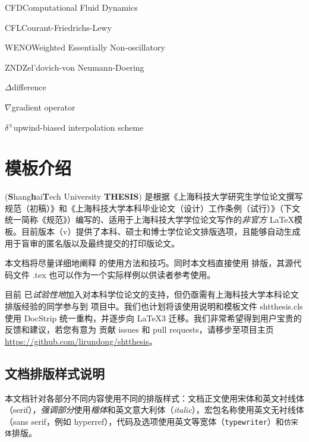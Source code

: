 \documentclass[master]{shtthesis}
\begin{document}
\begin{nomenclatures}[缩写]
  \item{CFD}{Computational Fluid Dynamics}
  \item{CFL}{Courant-Friedrichs-Lewy}
  \item{WENO}{Weighted Essentially Non-oscillatory}
  \item{ZND}{Zel'dovich-von Neumann-Doering}
\end{nomenclatures}

\begin{nomenclatures}[算子 \& 说明]
  \item{$\Delta$}{difference}
  \item{$\nabla$}{gradient operator}
  \item{$\delta^{\pm}$}{upwind-biased interpolation scheme}
\end{nomenclatures}
\fi

\mainmatter
\chapter{模板介绍}
\shtthesis{} (\textbf{S}hang\textbf{h}ai\textbf{T}ech University \textbf{THESIS}) 是根据《上海科技大学研究生学位论文撰写规范（初稿）》和《上海科技大学本科毕业论文（设计）工作条例（试行）》（下文统一简称《规范》）编写的、适用于上海科技大学学位论文写作的\emph{非官方} \LaTeX 模板。目前版本（v\version{}）提供了本科、硕士和博士学位论文排版选项，且能够自动生成用于盲审的匿名版以及最终提交的打印版论文。

本文档将尽量详细地阐释 \shtthesis{} 的使用方法和技巧。同时本文档直接使用 \shtthesis{} 排版，其源代码文件 \jobname.tex 也可以作为一个实际样例以供读者参考使用。

目前 \shtthesis{} 已\emph{试验性地}加入对本科学位论文的支持，但仍亟需有上海科技大学本科论文排版经验的同学参与到 \shtthesis{} 项目中。我们也计划将该使用说明和模板文件 shtthesis.cls 使用 \textsf{DocStrip} 统一重构，并逐步向 \LaTeX3 迁移。我们非常希望得到用户宝贵的反馈和建议，若您有意为 \shtthesis{} 贡献 issues 和 pull requests，请移步至项目主页 \url{https://github.com/lirundong/shtthesis}。

\section*{文档排版样式说明}
本文档针对各部分不同内容使用不同的排版样式：文档正文使用宋体和英文衬线体（serif），\emph{强调部分}使用\emph{楷体}和英文意大利体（\emph{italic}），宏包名称使用英文无衬线体（\textsf{sans serif}，例如 \textsf{hyperref}），代码及选项使用英文等宽体（\texttt{typewriter}）和\texttt{仿宋体}排版。
\end{document}
